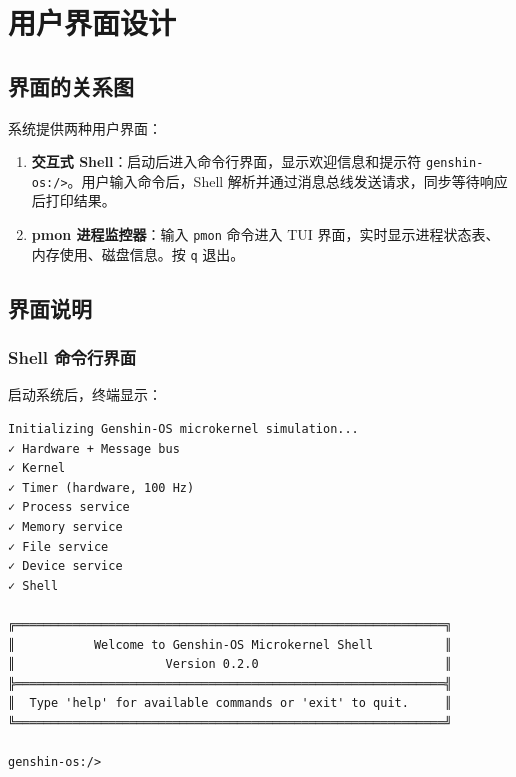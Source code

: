 \documentclass[UTF8,a4paper,12pt]{ctexart}
\begin{document}
\newpage


\section{用户界面设计}

\subsection{界面的关系图}

系统提供两种用户界面：

\begin{enumerate}[label=(\arabic*)]
    \item \textbf{交互式 Shell}：启动后进入命令行界面，显示欢迎信息和提示符 \texttt{genshin-os:/>}。用户输入命令后，Shell 解析并通过消息总线发送请求，同步等待响应后打印结果。
    \item \textbf{pmon 进程监控器}：输入 \texttt{pmon} 命令进入 TUI 界面，实时显示进程状态表、内存使用、磁盘信息。按 \texttt{q} 退出。
\end{enumerate}

\subsection{界面说明}

\subsubsection{Shell 命令行界面}

启动系统后，终端显示：

\begin{lstlisting}
Initializing Genshin-OS microkernel simulation...
✓ Hardware + Message bus
✓ Kernel
✓ Timer (hardware, 100 Hz)
✓ Process service
✓ Memory service
✓ File service
✓ Device service
✓ Shell

╔════════════════════════════════════════════════════════════╗
║           Welcome to Genshin-OS Microkernel Shell          ║
║                     Version 0.2.0                          ║
╠════════════════════════════════════════════════════════════╣
║  Type 'help' for available commands or 'exit' to quit.     ║
╚════════════════════════════════════════════════════════════╝

genshin-os:/>
\end{lstlisting}
\end{document}
